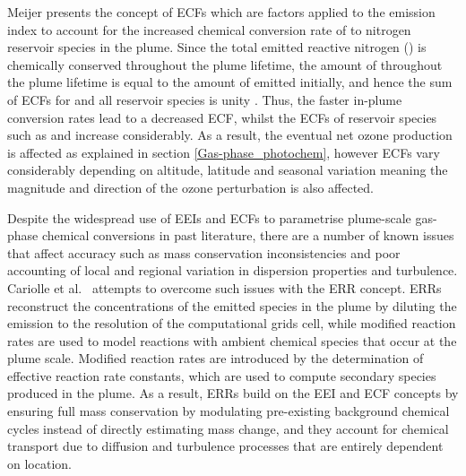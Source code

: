 Meijer \cite{Meijer2001} presents the concept of ECFs which are factors applied to the  emission index to account for the increased chemical conversion rate of  to nitrogen reservoir species in the plume. Since the total emitted reactive nitrogen () is chemically conserved throughout the plume lifetime, the amount of  throughout the plume lifetime is equal to the amount of  emitted initially, and hence the sum of ECFs for  and all reservoir species is unity \cite{Vohralik2008}. Thus, the faster in-plume conversion rates lead to a decreased  ECF, whilst the ECFs of reservoir species such as  and  increase considerably. As a result, the eventual net ozone production is affected as explained in section \ref{Gas-phase_photochem}, however ECFs vary considerably depending on altitude, latitude and seasonal variation meaning the magnitude and direction of the ozone perturbation is also affected.


Despite the widespread use of EEIs and ECFs to parametrise plume-scale gas-phase chemical conversions in past literature, there are a number of known issues that affect accuracy such as mass conservation inconsistencies and poor accounting of local and regional variation in dispersion properties and turbulence. Cariolle et al.\ \cite{Cariolle2009} attempts to overcome such issues with the ERR concept. ERRs reconstruct the concentrations of the emitted species in the plume by diluting the emission to the resolution of the computational grids cell, while modified reaction rates are used to model reactions with ambient chemical species that occur at the plume scale. Modified reaction rates are introduced by the determination of effective reaction rate constants, which are used to compute secondary species produced in the plume. As a result, ERRs build on the EEI and ECF concepts by ensuring full mass conservation by modulating pre-existing background chemical cycles instead of directly estimating mass change, and they account for chemical transport due to diffusion and turbulence processes that are entirely dependent on location. 


